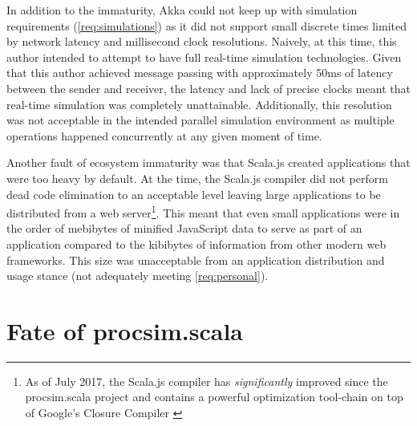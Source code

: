 In addition to the immaturity, Akka could not keep up with simulation requirements (\cref{req:simulations}) as it did not support small discrete times limited by network latency and millisecond clock resolutions. Naively, at this time, this author intended to attempt to have full real-time simulation technologies. Given that this author achieved message passing with approximately 50ms of latency between the sender and receiver, the latency and lack of precise clocks meant that real-time simulation was completely unattainable. Additionally, this resolution was not acceptable in the intended parallel simulation environment as multiple operations happened concurrently at any given moment of time. 

Another fault of ecosystem immaturity was that Scala.js created applications that were too heavy by default. At the time, the Scala.js compiler did not perform dead code elimination to an acceptable level leaving large applications to be distributed from a web server\footnote{As of July 2017, the Scala.js compiler has \textit{significantly} improved since the procsim.scala project and contains a powerful optimization tool-chain on top of Google's Closure Compiler \cite{Scala-js:CompOptPipeline}}. This meant that even small applications were in the order of mebibytes of minified JavaScript data to serve as part of an application compared to the kibibytes of information from other modern web frameworks. This size was unacceptable from an application distribution and usage stance (not adequately meeting \cref{req:personal}). 

\section{Fate of procsim.scala}

